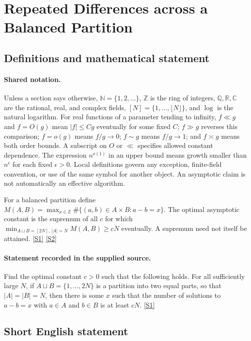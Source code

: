 \documentclass[11pt,a4paper]{article}
\newcommand{\N}{\mathbb{N}}
\newcommand{\Z}{\mathbb{Z}}
\newcommand{\Q}{\mathbb{Q}}
\newcommand{\R}{\mathbb{R}}
\newcommand{\C}{\mathbb{C}}
\newcommand{\sref}[2]{\hyperlink{source:#1:#2}{[S#2]}}
\begin{document}
\section{Repeated Differences across a Balanced Partition}\label{statement}


\subsection{Definitions and mathematical statement}

\paragraph{Shared notation.}Unless a section says otherwise, $\N=\{1,2,\ldots\}$,
$\Z$ is the ring of integers, $\Q,\R,\C$ are the rational, real, and complex
fields, $[N]=\{1,\ldots,\lfloor N\rfloor\}$, and $\log$ is the natural
logarithm. For real functions of a parameter tending to infinity,
$f\ll g$ and $f=O(g)$ mean $|f|\leq Cg$ eventually for some fixed $C$;
$f\gg g$ reverses this comparison; $f=o(g)$ means $f/g\to0$;
$f\sim g$ means $f/g\to1$; and $f\asymp g$ means both order bounds.
A subscript on $O$ or $\ll$ specifies allowed constant dependence.
The expression $n^{o(1)}$ in an upper bound means growth smaller than
$n^\epsilon$ for each fixed $\epsilon>0$. Local definitions govern any
exception, finite-field convention, or use of the same symbol for another
object. An asymptotic claim is not automatically an effective algorithm.



For a balanced partition define $M(A,B)=\max_{x\in\Z}\#\{(a,b)\in A\times B:a-b=x\}$. The optimal asymptotic constant is the supremum of all $c$ for which $\min_{A\sqcup B=[2N],\,|A|=N}M(A,B)\geq cN$ eventually. A supremum need not itself be attained. \sref{statement}{1} \sref{statement}{2}

\paragraph{Statement recorded in the supplied source.}
Find the optimal constant $c>0$ such that the following holds.
For all sufficiently large $N$, if $A\sqcup B=\{1,\ldots,2N\}$ is a partition into two equal parts, so that $\lvert A\rvert=\lvert B\rvert=N$, then there is some $x$ such that the number of solutions to $a-b=x$ with $a\in A$ and $b\in B$ is at least $cN$. \sref{statement}{1}

\subsection{Short English statement}
\end{document}
